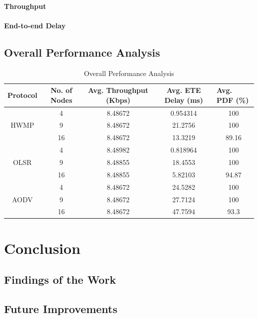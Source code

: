 \documentclass[12pt,a4paper]{report}
\begin{document}
\subsubsection{Throughput}
\subsubsection{End-to-end Delay}

\section{Overall Performance Analysis}
\begin{table}[h]
\centering
\begin{tabular}{|c|c|c|c|c|}
\hline
\multicolumn{1}{|l|}{Protocol} & No. of Nodes & Avg. Throughput (Kbps) & Avg. ETE Delay (ms) & \multicolumn{1}{l|}{Avg. PDF (\%)} \\ \hline
\multirow{3}{*}{HWMP}          & 4            & 8.48672                & 0.954314            & 100                                \\ \cline{2-5} 
                               & 9            & 8.48672                & 21.2756             & 100                                \\ \cline{2-5} 
                               & 16           & 8.48672                & 13.3219             & 89.16                              \\ \hline
\multirow{3}{*}{OLSR}          & 4            & 8.48982                & 0.818964            & 100                                \\ \cline{2-5} 
                               & 9            & 8.48855                & 18.4553             & 100                                \\ \cline{2-5} 
                               & 16           & 8.48855                & 5.82103             & 94.87                              \\ \hline
\multirow{3}{*}{AODV}          & 4            & 8.48672                & 24.5282             & 100                                \\ \cline{2-5} 
                               & 9            & 8.48672                & 27.7124             & 100                                \\ \cline{2-5} 
                               & 16           & 8.48672                & 47.7594             & 93.3                               \\ \hline
\end{tabular}
\caption{Overall Performance Analysis}
\label{Overall Performance Analysis}
\end{table}


\chapter{Conclusion}
\section{Findings of the Work}
\section{Future Improvements}
\end{document}
